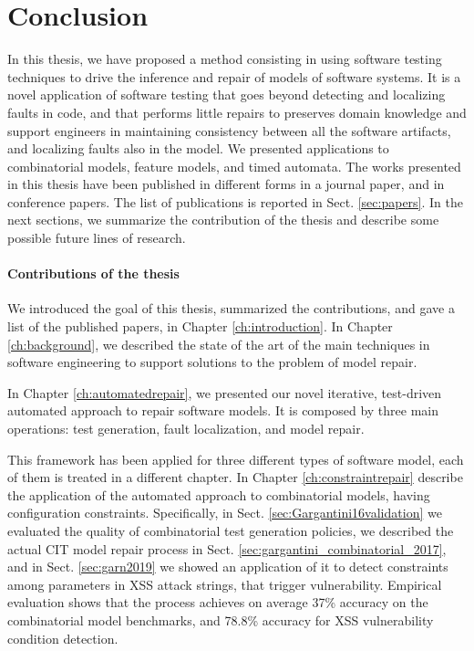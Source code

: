 \begin{tikzborder}{\cite{Gargantini16:validation}}
\begin{tikzborder}{\cite{gargantini_combinatorial_2017}}
\begin{tikzborder}{\cite{garn2019}}
\begin{tikzborder}{\cite{arcaini2019achieving}}
\chapter{Conclusion}
In this thesis, we have proposed a method consisting in using software testing techniques to drive the inference and repair of models of software systems.
It is a novel application of software testing that goes beyond detecting and localizing faults in code, and that performs little repairs to preserves domain knowledge and support engineers in maintaining consistency between all the software artifacts, and localizing faults also in the model. 
We presented applications to combinatorial models, feature models, and timed automata. 
The works presented in this thesis have been published in different forms in a journal paper, and in conference papers. The list of publications is reported in Sect. \ref{sec:papers}.
In the next sections, we summarize the contribution of the thesis and describe some possible future lines of research.

\subsubsection{Contributions of the thesis}
We introduced the goal of this thesis, summarized the contributions, and gave a list of the published papers, in Chapter \ref{ch:introduction}.
In Chapter \ref{ch:background}, we described the state of the art of the main techniques in software engineering to support solutions to the problem of model repair.

In Chapter \ref{ch:automatedrepair}, we presented our novel iterative, test-driven automated approach to repair software models. It is composed by three main operations: test generation, fault localization, and model repair.

This framework has been applied for three different types of software model, each of them is treated in a different chapter.
In Chapter \ref{ch:constraintrepair} describe the application of the automated approach to combinatorial models, having configuration constraints. Specifically, in Sect. \ref{sec:Gargantini16validation} we evaluated the quality of combinatorial test generation policies, we described the actual CIT model repair process in Sect. \ref{sec:gargantini_combinatorial_2017}, and in Sect. \ref{sec:garn2019} we showed an application of it to detect constraints among parameters in XSS attack strings, that trigger vulnerability.
Empirical evaluation shows that the process achieves on average 37\% accuracy on the combinatorial model benchmarks, and 78.8\% accuracy for XSS vulnerability condition detection.


\end{tikzborder}
\end{tikzborder}
\end{tikzborder}
\end{tikzborder}
